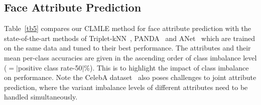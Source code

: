 \documentclass[10pt,journal,compsoc]{IEEEtran}
\begin{document}
\subsection{Face Attribute Prediction}

Table~\ref{tb5} compares our CLMLE method for face attribute prediction with the state-of-the-art methods of Triplet-kNN~\cite{Schroff15}, PANDA~\cite{Ning14} and ANet~\cite{liu15} which are trained on the same data and tuned to their best performance. The attributes and their mean per-class accuracies are given in the ascending order of class imbalance level ($=|$positive class rate-50$|$\%). This is to highlight the impact of class imbalance on performance. Note the CelebA dataset~\cite{liu15} also poses challenges to joint attribute prediction, where the variant imbalance levels of different attributes need to be handled simultaneously.
\end{document}
